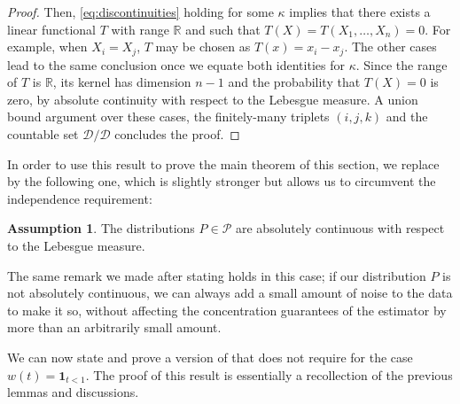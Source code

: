 \documentclass{article}
\theoremstyle{plain}
\theoremstyle{definition}
\newtheorem{assumption}{Assumption}
\def\R{\mathbb{R}} %
\def\sD{\mathcal{D}}\def\sE{\mathcal{E}}\def\sF{\mathcal{F}}
\def\sP{\mathcal{P}}\def\sQ{\mathcal{Q}}\def\sR{\mathcal{R}}
\begin{document}
\begin{appendix}
\begin{proof}
    Then, \eqref{eq:discontinuities} holding for some \( \kappa  \) implies that there exists a linear functional \( T \) with range \( \R \) and such that \( T(X)=T(X_1,\ldots,X_n)=0 \). For example, when \( X_i = X_j\), \( T \) may be chosen as \( T(x)=x_i-x_j \). The other cases lead to the same conclusion once we equate both identities for \( \kappa  \). Since the range of \( T \) is \( \R \), its kernel has dimension \( n-1 \) and the probability that \( T(X)=0 \) is zero, by absolute continuity with respect to the Lebesgue measure. A union bound argument over these cases, the finitely-many triplets \( (i,j,k) \) and the countable set \( \sD / \sD \) concludes the proof.
	\end{proof}
  In order to use this result to prove the main theorem of this section, we replace  by the following one, which is slightly stronger but allows us to circumvent the independence requirement:
\renewcommand\theassumption{3\ensuremath{^\prime}}
\begin{assumption}\label{assum:abs_continuous}
	The distributions \( P\in \sP \) are absolutely continuous with respect to the Lebesgue measure.
\end{assumption}\renewcommand\theassumption{\arabic{assumption}}
The same remark we made after stating  holds in this case; if our distribution \( P \) is not absolutely continuous, we can always add a small amount of noise to the data to make it so, without affecting the concentration guarantees of the estimator by more than an arbitrarily small amount.

We can now state and prove a version of  that does not require  for the case \( w(t)=\mathbf{1}_{t<1} \). The proof of this result is essentially a recollection of the previous lemmas and discussions.


\end{appendix}
\end{document}
